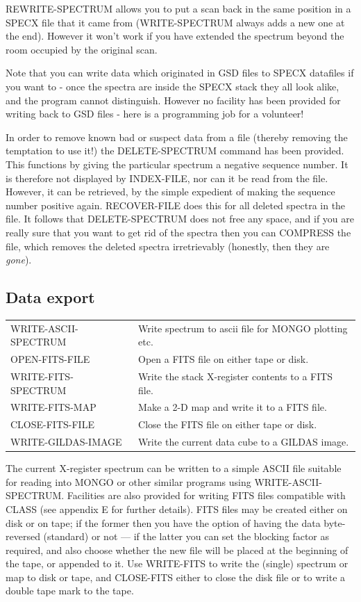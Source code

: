 \documentclass[11pt,twoside]{report}
\begin{document}
REWRITE-SPECTRUM allows you to put a scan back in the same position in a 
SPECX file that it came from (WRITE-SPECTRUM always adds a new one at the end).
However it won't work if you have extended the spectrum beyond the room occupied
by the original scan.

Note that you can write data which originated in GSD files to SPECX datafiles
if you want to - once the spectra are inside the SPECX stack they all look
alike, and the program cannot distinguish. However no facility has been provided
for writing back to GSD files - here is a programming job for a volunteer!

In order to remove known bad or suspect data from a file (thereby removing the
temptation to use it!) the DELETE-SPECTRUM command has been provided. This
functions by giving the particular spectrum a negative sequence number. It is
therefore not displayed by INDEX-FILE, nor can it be read from the file.
However, it can be retrieved, by the simple expedient of making the sequence
number positive again. RECOVER-FILE does this for all deleted spectra in the
file. It follows that DELETE-SPECTRUM does not free any space, and if you are
really sure that you want to get rid of the spectra then you can COMPRESS the
file, which removes the deleted spectra irretrievably (honestly, then they are
{\em gone}). 

\subsection{Data export}

\begin{tabular}{ll}
WRITE-ASCII-SPECTRUM   & Write spectrum to ascii file for MONGO plotting etc.\\
OPEN-FITS-FILE  & Open a FITS file on either tape or disk.\\
WRITE-FITS-SPECTRUM    & Write the stack X-register contents to a FITS file.\\
WRITE-FITS-MAP         & Make a 2-D map and write it to a FITS file.\\
CLOSE-FITS-FILE        & Close the FITS file on either tape or disk.\\
WRITE-GILDAS-IMAGE     & Write the current data cube to a GILDAS image.\\
\end{tabular}

The current X-register spectrum can be written to a simple ASCII file
suitable for reading into MONGO  or other similar programs using
WRITE-ASCII-SPECTRUM. Facilities are also provided for writing FITS
 files compatible with CLASS  (see appendix E for
further details). FITS files may be created either on disk or on tape; if the
former then you have the option of having the data byte-reversed (standard)
or not --- if the latter you can set the blocking factor as required, and
also choose whether the new file will be placed at the beginning of the tape,
or appended to it. Use WRITE-FITS to write the (single) spectrum or map to disk
or tape, and CLOSE-FITS either to close the disk file or to write a double tape
mark to the tape. 
\end{document}
